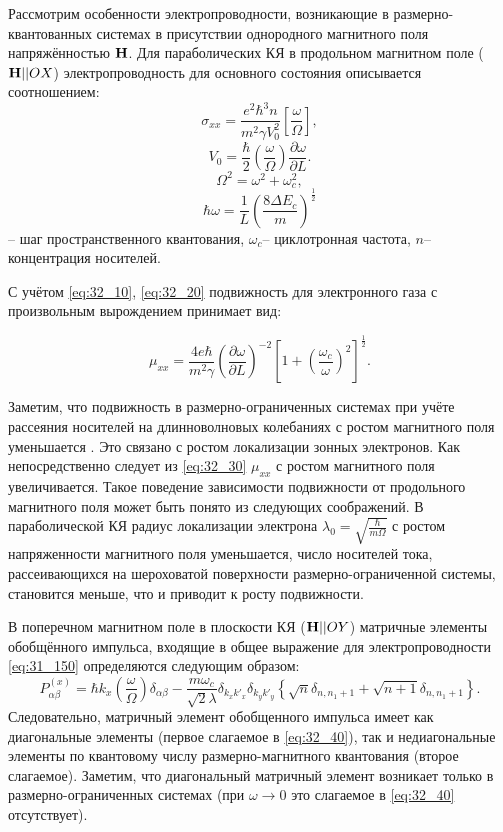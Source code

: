 Рассмотрим особенности электропроводности, возникающие в размерно-квантованных системах в присутствии однородного магнитного поля напряжённостью $\boldsymbol{\mathbf{H}}$. Для параболических КЯ в продольном магнитном поле ($\boldsymbol{\mathbf{H}} || OX$) электропроводность для основного состояния описывается соотношением:
\begin{equation} \label{eq:32_10}
\sigma_{xx} =\frac{e^2 \hbar^3 n}{m^2 \gamma V_0^2 } \left[\frac{\omega }{\Omega } \right],
 \end{equation}
 \begin{equation} \label{eq:32_20}
 V_0 =\frac{\hbar }{2} \left(\frac{\omega }{\Omega } \right)\frac{\partial \omega }{\partial L} .
 \end{equation}
\[
\Omega^2 =\omega^2 +\omega_c^2,
\] 
\[
\hbar \omega =\frac{1}{L} \left(\frac{8\Delta E_c }{m} \right)^{\frac{1}{2} } 
\]
-- шаг пространственного квантования, $\omega _{c} $-- циклотронная частота, $n$-- концентрация носителей.

С учётом \eqref{eq:32_10}, \eqref{eq:32_20} подвижность для электронного газа с произвольным вырождением принимает вид:

\begin{equation} \label{eq:32_30}
\mu _{xx} =\frac{4e\hbar }{m^{2} \gamma } \left(\frac{\partial \omega }{\partial L} \right)^{-2} \left[1+\left(\frac{\omega _{c} }{\omega } \right)^{2} \right]^{\frac{1}{2} }.
\end{equation}

Заметим, что подвижность в размерно-ограниченных системах при учёте рассеяния носителей на длинноволновых колебаниях с ростом магнитного поля уменьшается \cite{Sinyavskii1998}. Это связано с ростом локализации зонных электронов. Как непосредственно следует из \eqref{eq:32_30} $\mu _{xx} $ с ростом магнитного поля увеличивается. Такое поведение зависимости подвижности от продольного магнитного поля может быть понято из следующих соображений. В параболической КЯ радиус локализации электрона $\lambda _{0} =\sqrt{\frac{\hbar }{m\Omega } } $ с ростом напряженности магнитного поля уменьшается, число носителей тока, рассеивающихся на шероховатой поверхности размерно-ограниченной системы, становится меньше, что и приводит к росту подвижности.

В поперечном магнитном поле в плоскости КЯ ($\boldsymbol{\mathbf{H}} || OY$) матричные элементы обобщённого импульса, входящие в общее выражение для электропроводности \eqref{eq:31_150} определяются следующим образом:
\begin{equation} \label{eq:32_40}
P_{\alpha \beta }^{\left(x\right)} =\hbar k_{x} \left(\frac{\omega }{\Omega } \right)\delta _{\alpha \beta } -\frac{m\omega _{c} }{\sqrt{2} \lambda } \delta _{k_{x} k'_{x} } \delta _{k_{y} k'_{y} } \left\{\sqrt{n} \delta _{n,n_{1} +1} +\sqrt{n+1} \delta _{n,n_{1} +1} \right\}.
\end{equation}
Следовательно, матричный элемент обобщенного импульса имеет как диагональные элементы (первое слагаемое в \eqref{eq:32_40}), так и недиагональные элементы по квантовому числу размерно-магнитного квантования (второе слагаемое). Заметим, что диагональный матричный элемент возникает только в размерно-ограниченных системах (при $\omega \to 0$ это слагаемое в \eqref{eq:32_40} отсутствует).

